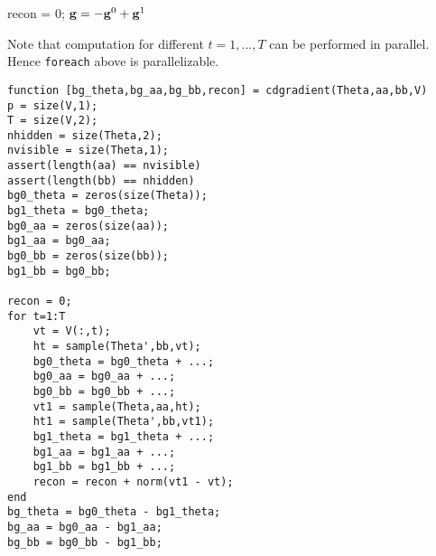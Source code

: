 \documentclass{article}
\begin{document}
\begin{center}
\begin{algorithm}[H]
\DontPrintSemicolon
{}
recon = 0;
$\mathbf{g} = -\mathbf{g}^0 + \mathbf{g}^1$\;
\end{algorithm}
\end{center}
Note that computation for different $t=1,...,T$ can be performed in parallel.
Hence \verb|foreach| above is parallelizable.

\begin{verbatim}
function [bg_theta,bg_aa,bg_bb,recon] = cdgradient(Theta,aa,bb,V)
p = size(V,1);
T = size(V,2);
nhidden = size(Theta,2);
nvisible = size(Theta,1);
assert(length(aa) == nvisible)
assert(length(bb) == nhidden)
bg0_theta = zeros(size(Theta));
bg1_theta = bg0_theta;
bg0_aa = zeros(size(aa));
bg1_aa = bg0_aa;
bg0_bb = zeros(size(bb));
bg1_bb = bg0_bb;

recon = 0;
for t=1:T
    vt = V(:,t);
    ht = sample(Theta',bb,vt);
    bg0_theta = bg0_theta + ...;
    bg0_aa = bg0_aa + ...;
    bg0_bb = bg0_bb + ...;
    vt1 = sample(Theta,aa,ht);
    ht1 = sample(Theta',bb,vt1);
    bg1_theta = bg1_theta + ...;
    bg1_aa = bg1_aa + ...;
    bg1_bb = bg1_bb + ...;
    recon = recon + norm(vt1 - vt);
end
bg_theta = bg0_theta - bg1_theta;
bg_aa = bg0_aa - bg1_aa;
bg_bb = bg0_bb - bg1_bb;
\end{verbatim}
\end{document}
